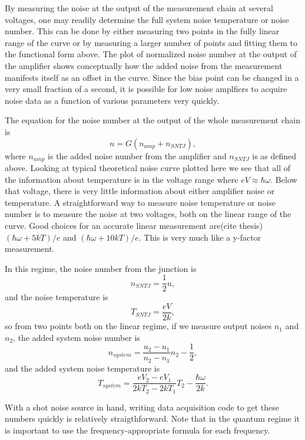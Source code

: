 \documentclass[11pt]{article}
\begin{document}
By measuring the noise at the output of the measurement chain at several voltages, one may readily determine the full system noise temperature or noise number.  This can be done by either measuring two points in the fully linear range of the curve or by measuring a larger number of points and fitting them to the functional form above.  The plot of normalized noise number at the output of the amplifier shows conceptually how the added noise from the measurement manifests itself as an offset in the curve.  Since the bias point can be changed in a very small fraction of a second, it is possible for low noise amplfiers to acquire noise data as a function of various parameters very quickly.  



The equation for the noise number at the output of the whole measurement chain is
$$
n = G(n_{amp} + n_{SNTJ}),
$$
where $n_{amp}$ is the added noise number from the amplifier and $n_{SNTJ}$ is as defined above.  Looking at typical theoretical noise curve plotted here we see that all of the information about temperature is in the voltage range where $eV\approx\hbar\omega$.  Below that voltage, there is very little information about either amplifier noise or temperature.  A straightforward way to measure noise temperature or noise number is to measure the noise at two voltages, both on the linear range of the curve.  Good choices for an accurate linear measurement are(cite thesis) $(\hbar\omega + 5 kT)/e$ and $(\hbar\omega + 10 kT)/e$.  This is very much like a y-factor measurement.  

	In this regime, the noise number from the junction is 
$$
n_{SNTJ} =  \frac{1}{2}u,
$$
and the noise temperature is 
$$
T_{SNTJ} = \frac{eV}{2k},
$$
so from two points both on the linear regime, if we measure output noises $n_1$ and$n_2$, the added system noise number is 
$$
n_{system} = \frac{u_2 -  u_1}{n_2 - n_1}n_2 - \frac{1}{2},
$$
and the added system noise temperature is 
$$
T_{system} = \frac{eV_2 - eV_1}{2kT_2 - 2kT_1}T_2 - \frac{\hbar\omega}{2k}.
$$

	With a shot noise source in hand, writing data acquisition code to get these numbers quickly is relatively straigthforward.  Note that in the quantum regime it is important to use the frequency-appropriate formula for each frequency.  
	
\end{document}
